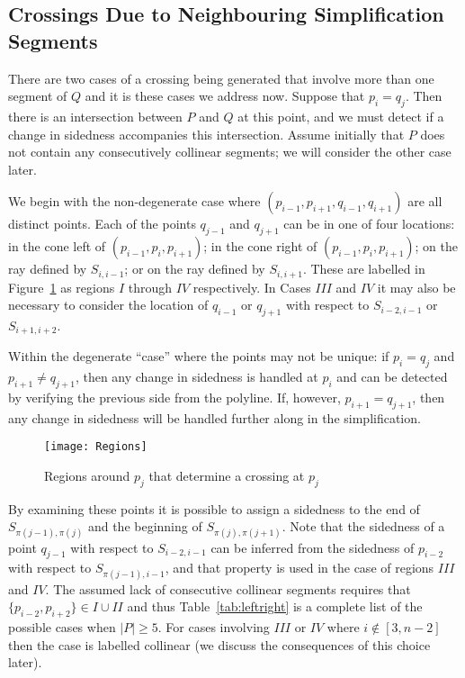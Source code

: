 \documentclass{article}
\begin{document}
\subsection{Crossings Due to Neighbouring Simplification Segments}
\label{sect:xmultiplesegment}

There are two cases of a crossing being generated that involve more than one segment of $Q$ and it
is these cases we address now.  Suppose that $p_i=q_j$.  Then there is
an intersection between $P$ and $Q$ at this point, and we must detect if a
change in sidedness accompanies this intersection.  Assume initially
that $P$ does not contain any consecutively collinear segments; we will
consider the other case later.  

We begin with the non-degenerate case where $(p_{i-1},p_{i+1},q_{i-1},q_{i+1})$ 
are all distinct points. Each of the
points $q_{j-1}$ and $q_{j+1}$ can be in one of four locations: in the cone
left of $(p_{i-1},p_i,p_{i+1})$; in the cone right of
$(p_{i-1},p_i,p_{i+1})$; on the ray defined by $S_{i,i-1}$; or on the ray
defined by $S_{i,i+1}$.  These are labelled in Figure~\ref{fig:locations} as 
regions $I$ through $IV$ respectively.  In Cases $III$ and $IV$ it
may also be necessary to consider the location of $q_{i-1}$ or
$q_{j+1}$ with respect to $S_{i-2,i-1}$ or $S_{i+1,i+2}$.

Within the degenerate ``case'' where the points may not be unique: if  $p_i = q_j$ and $p_{i+1} \neq q_{j+1}$, then any change in sidedness is handled at $p_i$ and can be detected by verifying the
previous side from the polyline.  If, however, $p_{i+1} = q_{j+1}$, then any change in
sidedness will be handled further along in the simplification.
	
\begin{figure}
\texttt{[image: Regions]}
\caption{Regions around $p_j$ that determine a crossing at $p_j$}
\label{fig:locations}
\end{figure}

By examining these points it is possible to assign a sidedness to
the end of $S_{\pi(j-1),\pi(j)}$ and the beginning of
$S_{\pi(j),\pi(j+1)}$.  Note that the sidedness of a point $q_{j-1}$ with
respect to $S_{i-2,i-1}$ can be inferred from the sidedness of $p_{i-2}$ with
respect to $S_{\pi(j-1),i-1}$, and that property is used in the case of
regions $III$ and $IV$. 
The assumed lack of consecutive collinear segments requires that
$\{p_{i-2},p_{i+2}\}\in I \cup II$ and thus Table~\ref{tab:leftright} is a
complete list of the possible cases when $|P|\geq 5$.
For cases involving $III$ or $IV$ where $i\notin[3,n-2]$ then the case
is labelled collinear (we discuss the consequences of this choice later).
\end{document}
